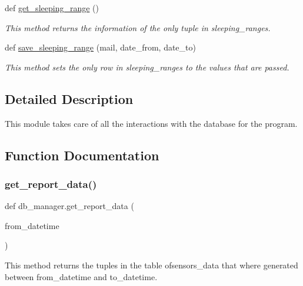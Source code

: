 \begin{DoxyCompactItemize}
def \hyperlink{namespacedb__manager_a2d024bbfed2a6a3a23a5e4084156cfcf}{get\+\_\+sleeping\+\_\+range} ()
\begin{DoxyCompactList}\small\item\em This method returns the information of the only tuple in \textquotesingle{}sleeping\+\_\+ranges\textquotesingle{}. \end{DoxyCompactList}\item 
def \hyperlink{namespacedb__manager_a570c34a3b285ca86ee9baac4f355b1cf}{save\+\_\+sleeping\+\_\+range} (mail, date\+\_\+from, date\+\_\+to)
\begin{DoxyCompactList}\small\item\em This method sets the only row in \textquotesingle{}sleeping\+\_\+ranges\textquotesingle{} to the values that are passed. \end{DoxyCompactList}\end{DoxyCompactItemize}


\subsection{Detailed Description}
This module takes care of all the interactions with the database for the program. 

\subsection{Function Documentation}
\mbox{\label{namespacedb__manager_aee66056354dad1518adcff1915f4a1cf}} 
\subsubsection{\texorpdfstring{get\+\_\+report\+\_\+data()}{get\_report\_data()}}
{\footnotesize\ttfamily def db\+\_\+manager.\+get\+\_\+report\+\_\+data (\begin{DoxyParamCaption}\item[{}]{from\+\_\+datetime }\end{DoxyParamCaption})}



This method returns the tuples in the table of\textquotesingle{}sensors\+\_\+data\textquotesingle{} that where generated between \textquotesingle{}from\+\_\+datetime\textquotesingle{} and \textquotesingle{}to\+\_\+datetime\textquotesingle{}. 


